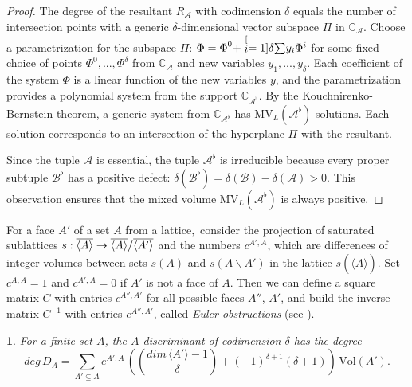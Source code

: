 \documentclass[11pt]{article}
\theoremstyle{plain}
\newtheorem{thm}{\protect\theoremname}[section]
\theoremstyle{definition}
\theoremstyle{remark}
\theoremstyle{plain}
\theoremstyle{plain}
\theoremstyle{plain}
\theoremstyle{definition}
\providecommand{\theoremname}{Theorem}
\begin{document}
\begin{proof}
The degree of the resultant $R_{\mathscr{A}}$ with codimension $\delta$
equals the number of intersection points with a generic $\delta$-dimensional
vector subspace $\Pi$ in $\mathbb{C}_{\mathscr{A}}$. Choose a parametrization
for the subspace $\Pi$: $\Phi=\text{\ensuremath{\Phi}}^{0}+\stackrel[i=1]{\delta}{\sum}y_{i}\Phi^{i}$
for some fixed choice of points $\Phi^{0},...,\Phi^{\delta}$ from
$\mathbb{C}_{\mathscr{A}}$ and new variables $y_{1},...,y_{\delta}$.
Each coefficient of the system $\Phi$ is a linear function of the
new variables $y$, and the parametrization provides a polynomial
system from the support $\mathbb{C}_{\mathscr{A}^{\flat}}$. By the
Kouchnirenko-Bernstein theorem, a generic system from $\mathbb{C}_{\mathscr{A}^{\flat}}$
has $\mathrm{MV}_{L}(\mathscr{A}^{\flat})$ solutions. Each solution
corresponds to an intersection of the hyperplane $\Pi$ with the resultant.

Since the tuple $\mathscr{A}$ is essential, the tuple $\mathscr{A}^{\flat}$
is irreducible because every proper subtuple $\mathscr{B}^{\flat}$
has a positive defect: $\delta(\mathscr{B}^{\flat})=\delta(\mathscr{B})-\delta(\mathscr{A})>0$.
This observation ensures that the mixed volume $\mathrm{MV}_{L}(\mathscr{A}^{\flat})$
is always positive.
\end{proof}
For a face $A'$ of a set $A$ from a lattice$,$ consider the projection
of saturated sublattices $s:\ensuremath{\overline{\langle A\rangle}}\rightarrow\ensuremath{\overline{\langle A\rangle}}/\text{\ensuremath{\overline{\langle A'\rangle}}}$
and the numbers $c^{A',A}$, which are differences of integer volumes
between sets $s(A)$ and $s(A\backslash A')$ in the lattice $s(\ensuremath{\overline{\langle A\rangle}}).$
Set $c^{A,A}=1$ and $c^{A',A}=0$ if $A'$ is not a face of $A$.
Then we can define a square matrix $C$ with entries $c^{A'',A'}$
for all possible faces $A''$, $A'$, and build the inverse matrix
$C^{-1}$ with entries $e^{A'',A'}$, called \textit{Euler obstructions}
(see \cite{esterov_newton_2010}).
\begin{thm}
\label{Theorem. Matsui-Takeuchi, Degree of the Cayley discriminant}\textup{\cite{matsui_geometric_2011}
For a finite set $A$, the $A$-discriminant of codimension $\delta$
has the degree
\[
deg\,D_{A}=\underset{A'\subseteq A}{\sum}e^{A',A}\,\left(\binom{dim\,\langle A'\rangle-1}{\delta}+(-1)^{\delta+1}(\delta+1)\right)\,\mathrm{Vol}(A').
\]
}
\end{thm}
\end{document}
